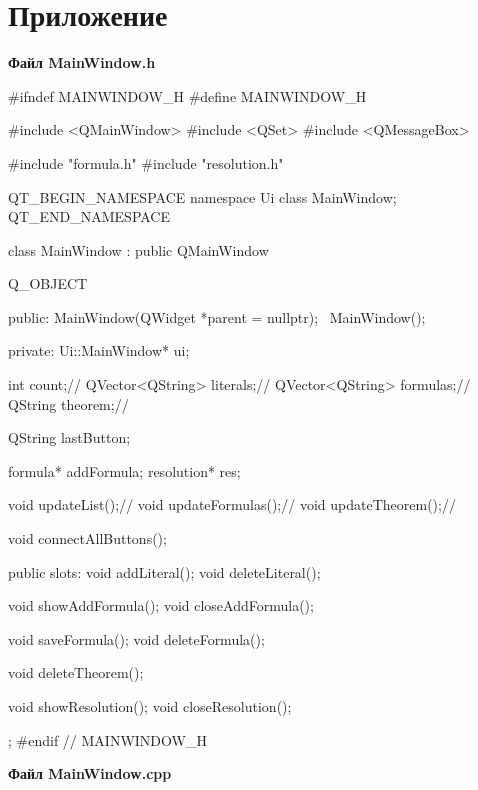 \documentclass[12pt, a4paper]{article}
\begin{document}
	 \section*{\textbf{Приложение}}
	 \begin{center}
	 	\textbf{Файл MainWindow.h}
	 \end{center}
	 \begin{cppcode}[caption = Файл MainWindow.h]
	 	#ifndef MAINWINDOW_H
	 	#define MAINWINDOW_H
	 	
	 	#include <QMainWindow>
	 	#include <QSet>
	 	#include <QMessageBox>
	 	
	 	#include "formula.h"
	 	#include "resolution.h"
	 	
	 	
	 	QT_BEGIN_NAMESPACE
	 	namespace Ui { class MainWindow; }
	 	QT_END_NAMESPACE
	 	
	 	class MainWindow : public QMainWindow
	 	{
	 		Q_OBJECT
	 		
	 		public:
	 		MainWindow(QWidget *parent = nullptr);
	 		~MainWindow();
	 		
	 		private:
	 		Ui::MainWindow* ui;
	 		
	 		int count;//
	 		QVector<QString> literals;//
	 		QVector<QString> formulas;//
	 		QString theorem;//
	 		
	 		QString lastButton;
	 		
	 		formula* addFormula;
	 		resolution* res;
	 		
	 		void updateList();//
	 		void updateFormulas();//
	 		void updateTheorem();//
	 		
	 		void connectAllButtons();
	 		
	 		
	 		public slots:
	 		void addLiteral();
	 		void deleteLiteral();
	 		
	 		void showAddFormula();
	 		void closeAddFormula();
	 		
	 		void saveFormula();
	 		void deleteFormula();
	 		
	 		void deleteTheorem();
	 		
	 		void showResolution();
	 		void closeResolution();
	 		
	 	};
	 	#endif // MAINWINDOW_H
	 \end{cppcode}
	  \centering \textbf{Файл MainWindow.cpp}
\end{document}
